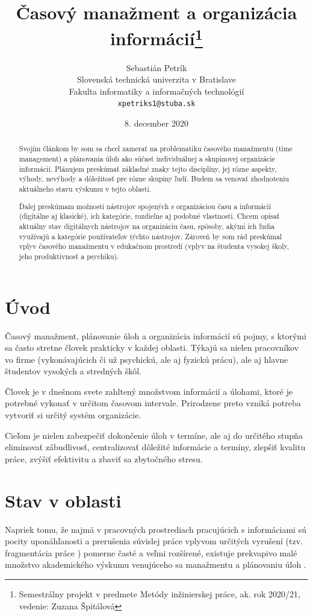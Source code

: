 \documentclass[10pt,slovak,a4paper]{article}
\title{Časový manažment a organizácia informácií\thanks{Semestrálny projekt v predmete Metódy inžinierskej práce, ak. rok 2020/21, vedenie: Zuzana Špitálová}}
\author{Sebastián Petrík\\[2pt]
	{\small Slovenská technická univerzita v Bratislave}\\
	{\small Fakulta informatiky a informačných technológií}\\
	{\small \texttt{xpetriks1@stuba.sk}}
	}
\date{\small 8. december 2020}
\begin{document}
\maketitle

\begin{abstract}
Svojím článkom by som sa chcel zamerať na problematiku časového manažmentu (time management) a plánovania úloh ako súčasť individuálnej a skupinovej organizácie informácií. Plánujem preskúmať základné znaky tejto disciplíny, jej rôzne aspekty, výhody, nevýhody a dôležitosť pre rôzne skupiny ľudí. Budem sa venovať zhodnoteniu aktuálneho stavu výskumu v tejto oblasti.

Ďalej preskúmam možnosti nástrojov spojených s organizáciou času a informácií (digitálne aj klasické), ich kategórie, rozdielne aj podobné vlastnosti. Chcem opísať aktuálny stav digitálnych nástrojov na organizáciu času, spôsoby, akými ich ľudia využívajú a kategórie používateľov týchto nástrojov. Zároveň by som rád preskúmal vplyv časového manažmentu v edukačnom prostredí (vplyv na študenta vysokej školy, jeho produktívnosť a psychiku).

\end{abstract}
\newpage

\section{Úvod}

	Časový manažment, plánovanie úloh a organizácia informácií sú pojmy, s ktorými sa často stretne človek prakticky v každej oblasti. Týkajú sa nielen pracovníkov vo firme (vykonávajúcich či už psychickú, ale aj fyzickú prácu), ale aj hlavne študentov vysokých a stredných škôl.
	
	Človek je v dnešnom svete zahltený množstvom informácií a úlohami, ktoré je potrebné vykonať v určitom časovom intervale. Prirodzene preto vzniká potreba vytvoriť si určitý systém organizácie.
	
	Cieľom je nielen zabezpečiť dokončenie úloh v termíne, ale aj do určitého stupňa eliminovať zábudlivosť, centralizovať dôležité informácie a termíny, zlepšiť kvalitu práce, zvýšiť efektivitu a zbaviť sa zbytočného stresu.
	
\section{Stav v oblasti}

	Napriek tomu, že najmä v pracovných prostrediach pracujúcich s informáciami sú pocity uponáhľanosti a prerušenia súvislej práce vplyvom určitých vyrušení (tzv. fragmentácia práce \cite{NoTask}) pomerne časté a veľmi rozšírené, existuje prekvapivo malé množstvo akademického výskumu venujúceho sa manažmentu a plánovaniu úloh \cite{Franssila}. 
	
\end{document}
